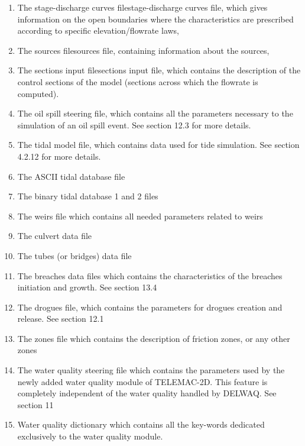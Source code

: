 \begin{enumerate}
\item  The stage-discharge curves filestage-discharge curves file, which gives information on the open boundaries where the characteristics are prescribed according to specific elevation/flowrate laws,

\item  The sources filesources file, containing information about the sources,

\item  The sections input filesections input file, which contains the description of the control sections of the model (sections across which the flowrate is computed).

\item  The oil spill steering file, which contains all the parameters necessary to the simulation of an oil spill event.  See section 12.3 for more details.

\item  The tidal model file, which contains data used for tide simulation. See section 4.2.12 for more details.

\item  The ASCII tidal database file

\item  The binary tidal database 1 and 2 files

\item  The weirs file which contains all needed parameters related to weirs

\item  The culvert data file

\item  The tubes (or bridges) data file

\item  The breaches data files which contains the characteristics of the breaches initiation and growth. See section 13.4

\item  The drogues file, which contains the parameters for drogues creation and release. See section 12.1

\item  The zones file which contains the description of friction zones, or any other zones

\item  The water quality steering file which contains the parameters used by the newly added water quality module of TELEMAC-2D. This feature is completely independent of the water quality handled by DELWAQ. See section 11

\item  Water quality dictionary which contains all the key-words dedicated exclusively to the water quality module.
\end{enumerate}



